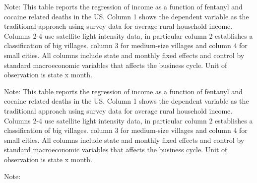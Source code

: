 \documentclass[12 pt,fullpage]{article}
\theoremstyle{plain}
\begin{document}
\newpage
\begin{table}[h!]
	\begin{center}
		\scalebox{0.6}{
			}
		\caption{}
	\end{center}
\end{table}
\vspace{-3mm}
\footnotesize Note: This table reports the regression of income as a function of fentanyl and cocaine related deaths in the US. Column 1 shows the dependent variable as the traditional approach using survey data for average rural household income. Columns 2-4 use satellite light intensity data, in particular column 2 establishes a classification of big villages. column 3 for medium-size villages and column 4 for small cities. All columns include state and monthly fixed effects and control by standard macroeconomic variables that affects the business cycle. Unit of observation is state x month. 

\newpage
\begin{table}[h!]
	\begin{center}
		\scalebox{0.6}{
			}
		\caption{}
	\end{center}
\end{table}
\vspace{-3mm}
\footnotesize Note: This table reports the regression of income as a function of fentanyl and cocaine related deaths in the US. Column 1 shows the dependent variable as the traditional approach using survey data for average rural household income. Columns 2-4 use satellite light intensity data, in particular column 2 establishes a classification of big villages. column 3 for medium-size villages and column 4 for small cities. All columns include state and monthly fixed effects and control by standard macroeconomic variables that affects the business cycle. Unit of observation is state x month. 

\newpage
\begin{table}[h!]
	\begin{center}
		\scalebox{0.6}{
			}
		\caption{}
	\end{center}
\end{table}
\vspace{-3mm}
\footnotesize Note:
\end{document}
